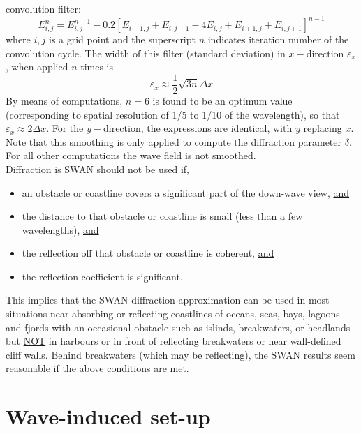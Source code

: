 \documentclass[12pt]{book}
\begin{document}
convolution filter:
\begin{equation}
  E_{i,j}^n = E_{i,j}^{n-1} - 0.2 [E_{i-1,j}+E_{i,j-1}-4E_{i,j}+E_{i+1,j}+E_{i,j+1}]^{n-1}
\end{equation}
where $i,j$ is a grid point and the superscript $n$ indicates iteration number of the convolution cycle.
The width of this filter (standard deviation) in $x-$direction $\varepsilon_x$, when applied $n$ times is
\begin{equation}
  \varepsilon_x \approx \frac{1}{2} \sqrt{3n} \Delta x
\end{equation}
By means of computations, $n=6$ is found to be an optimum value (corresponding to spatial resolution of
1/5 to 1/10 of the wavelength), so that $\varepsilon_x \approx 2\Delta x$. For the $y-$direction, the expressions
are identical, with $y$ replacing $x$. Note that this smoothing is only applied to compute the diffraction
parameter $\delta$. For all other computations the wave field is not smoothed.
\\[2ex]
\noindent
Diffraction is SWAN should \underline{not} be used if,
\begin{itemize}
  \item an obstacle or coastline covers a significant part of the down-wave view, \underline{and}
  \item the distance to that obstacle or coastline is small (less than a few wavelengths), \underline{and}
  \item the reflection off that obstacle or coastline is coherent, \underline{and}
  \item the reflection coefficient is significant.
\end{itemize}
This implies that the SWAN diffraction approximation can be used in most situations near absorbing or reflecting
coastlines of oceans, seas, bays, lagoons and fjords with an occasional obstacle such as islinds, breakwaters,
or headlands but \underline{NOT} in harbours or in front of reflecting breakwaters or near wall-defined
cliff walls. Behind breakwaters (which may be reflecting), the SWAN results seem reasonable if the above
conditions are met.

\section{Wave-induced set-up} \label{sec:setup}
\end{document}
